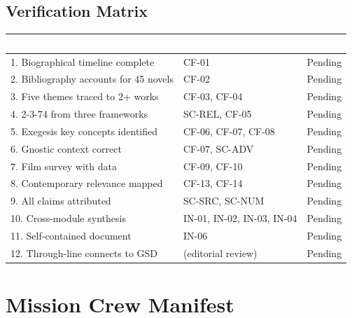 \documentclass[11pt,letterpaper]{article}
\newcommand{\tableheader}[1]{\textbf{\sffamily\textcolor{white}{#1}}}
\begin{document}
\subsection{Verification Matrix}

\begin{center}
\begin{tabularx}{\textwidth}{XL{3cm}C{1.5cm}}
\toprule
{}
\tableheader{Success Criterion} & \tableheader{Test ID(s)} & \tableheader{Status} \\
. Biographical timeline complete & CF-01 & Pending \\
2. Bibliography accounts for 45 novels & CF-02 & Pending \\
3. Five themes traced to 2+ works & CF-03, CF-04 & Pending \\
4. 2-3-74 from three frameworks & SC-REL, CF-05 & Pending \\
5. Exegesis key concepts identified & CF-06, CF-07, CF-08 & Pending \\
6. Gnostic context correct & CF-07, SC-ADV & Pending \\
7. Film survey with data & CF-09, CF-10 & Pending \\
8. Contemporary relevance mapped & CF-13, CF-14 & Pending \\
9. All claims attributed & SC-SRC, SC-NUM & Pending \\
10. Cross-module synthesis & IN-01, IN-02, IN-03, IN-04 & Pending \\
11. Self-contained document & IN-06 & Pending \\
12. Through-line connects to GSD & (editorial review) & Pending \\
\bottomrule
\end{tabularx}
\end{center}

\section{Mission Crew Manifest}
\end{document}
